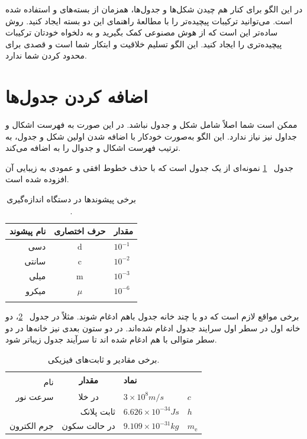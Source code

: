 در این الگو برای کنار هم چیدن شکل‌ها و جدول‌ها، همزمان از بسته‌های 
 و  \latex 
استفاده شده است. می‌توانید ترکیبات پیچیده‌تر را با مطالعهٔ راهنمای این دو بسته‌ ایجاد کنید. روش ساده‌تر این است که از هوش مصنوعی کمک بگیرید و به دلخواه خودتان ترکیبات پیچیده‌تری را ایجاد کنید. این الگو تسلیم خلاقیت و ابتکار شما است و قصدی برای محدود کردن شما ندارد.


\section{اضافه کردن جدول‌ها}
ممکن است 
\thesis 
شما اصلاً شامل شکل و جدول نباشد. در این صورت به فهرست اشکال و جداول نیز نیاز ندارد. این الگو به‌صورت خودکار با اضافه شدن اولین شکل و جدول، به ترتیب فهرست اشکال و جدوال را به 
\thesis 
اضافه می‌کند. 

جدول~%
\ref{tab3:1} 
نمونه‌ای از یک جدول است که با حذف خطوط افقی و عمودی به زیبایی آن افزوده شده است.

\begin{table}[!htbp] %
\caption{\small
برخی پیشوندها در دستگاه اندازه‌گیری 
.}\label{tab3:1}
\begin{center}\small\begin{tabular}{rcl} 
\hline\noalign{\smallskip}
\textbf{
نام پیشوند} & \textbf{حرف اختصاری} & \textbf{مقدار}\\[4pt] 
\hline\noalign{\smallskip}
دسی
& $\mathrm{d}$ & $10^{-1}$\\
سانتی
& $\mathrm{c}$ & $10^{-2}$\\
میلی
& $\mathrm{m}$ & $10^{-3}$\\
میکرو
& $\mu$        & $10^{-6}$\\[4pt]
\hhline{===}
\end{tabular}\end{center}
\end{table}

برخی مواقع لازم است که دو یا چند خانه جدول باهم ادغام شوند. مثلاً در جدول~%
\ref{tab3:2}، 
دو خانه اول در سطر اول سرایند جدول ادغام شده‌اند. در دو ستون بعدی نیز خانه‌ها در دو سطر متوالی با هم ادغام شده اند تا سرآیند جدول زیباتر شود.

\begin{table}[!htbp] %
\small\caption{
برخی مقادیر و ثابت‌های فیزیکی.}
\label{tab3:2}
\begin{tabular}{rcll} 
\hline\noalign{\smallskip}
\multicolumn{2}{c}{\textbf{
ثابت‌های فیزیکی}} & 
\multirow{2}{*}{\textbf{مقدار}} & 
\multirow{2}{*}{\textbf{نماد}}\\[4pt]
\hhline{--} \noalign{\smallskip}
نام & توضیحات \\[4pt]
\hline \noalign{\smallskip}
سرعت نور & در خلا &
$3 \times 10^8\unit{m/s}$ & $c$\\
\multicolumn{2}{r}{
ثابت پلانک} & 
$6.626 \times 10^{-34}\unit{Js}$ & $h$\\
جرم الکترون & در حالت سکون & 
$9.109 \times 10^{-31}\unit{kg}$ & $m_\mathrm{e}$\\[4pt]
\hline
\end{tabular}
\end{table}

